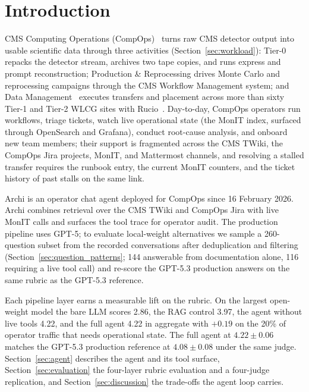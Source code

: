 \section{Introduction}
\label{sec:introduction}

CMS Computing Operations
(CompOps)~\cite{cms_computing_tdr,cms_compops} turns raw CMS
detector output into usable scientific data through three
activities (Section~\ref{sec:workload}): Tier-0 repacks the
detector stream, archives two tape copies, and runs express and
prompt reconstruction; Production \& Reprocessing drives Monte
Carlo and reprocessing campaigns through the CMS Workflow
Management system; and Data
Management~\cite{cms_dm2025} executes transfers and placement
across more than sixty Tier-1 and Tier-2 WLCG sites with
Rucio~\cite{rucio2014,cms_rucio2020}.
Day-to-day, CompOps operators run workflows, triage tickets,
watch live operational state (the MonIT index, surfaced through
OpenSearch and Grafana), conduct root-cause analysis, and onboard
new team members; their support is fragmented across the CMS
TWiki, the CompOps Jira projects, MonIT, and Mattermost channels,
and resolving a stalled transfer requires the runbook entry, the
current MonIT counters, and the ticket history of past stalls on
the same link.

Archi is an operator chat agent deployed for CompOps since 16
February 2026. Archi combines retrieval over the CMS TWiki and
CompOps Jira with live MonIT calls and surfaces the tool trace
for operator audit. The production pipeline uses GPT-5; to
evaluate local-weight alternatives we sample a 260-question
subset from the recorded conversations after deduplication and
filtering (Section~\ref{sec:question_patterns}; 144 answerable
from documentation alone, 116 requiring a live tool call) and
re-score the GPT-5.3 production answers on the same rubric as
the GPT-5.3 reference.

Each pipeline layer earns a measurable lift on the rubric. On
the largest open-weight model the bare LLM scores 2.86, the
RAG control 3.97, the agent without live tools 4.22, and the
full agent 4.22 in aggregate with $+0.19$ on the 20\% of
operator traffic that needs operational state. The full agent
at $4.22 \pm 0.06$ matches the GPT-5.3 production reference at
$4.08 \pm 0.08$ under the same judge.
Section~\ref{sec:agent} describes the agent and its tool
surface, Section~\ref{sec:evaluation} the four-layer rubric
evaluation and a four-judge replication, and
Section~\ref{sec:discussion} the trade-offs the agent loop
carries.
